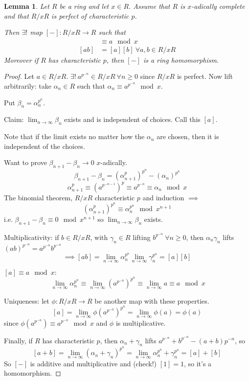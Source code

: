 \documentclass[a4paper]{article}
\newtheorem{lemma}[definition]{Lemma}
\begin{document}
\begin{lemma}
	Let $R$ be a ring and let $x \in R$.
	Assume that $R$ is $x$-adically complete and that $R/xR$ is perfect of characteristic $p$.
	
	Then $\exists!$ map $[-]: R/xR \to R$ such that
	\begin{align*}
		[a] &\equiv a \mod x \\
		[ab] &= [a][b]\ \forall a,b \in R/xR
	\end{align*}
	Moreover if $R$ has characteristic $p$, then $[-]$ is a ring homomorphism.
\end{lemma}
\begin{proof}
	Let $a \in R/xR$.
	$\exists!\ a^{p^{-n}} \in R/xR\ \forall n \geq 0$ since $R/xR$ is perfect.
	Now lift arbitrarily: take $\alpha_n \in R$ such that $\alpha_n \equiv a^{p^{-n}} \mod x$.
	
	Put $\beta_n = \alpha_n^{p^n}$.
	
	Claim: $\lim_{n \to \infty} \beta_n$ exists and is independent of choices. Call this $[a]$.
	
	Note that if the limit exists no matter how the $\alpha_n$ are chosen,
	then it is independent of the choices.
	
	Want to prove $\beta_{n+1} - \beta_n \to 0$ $x$-adically.
	$$\beta_{n+1} - \beta_n = (\alpha_{n+1}^p)^{p^n}-(\alpha_{n})^{p^n}$$
	$$\alpha_{n+1}^p \equiv (a^{p^{-n-1}})^p \equiv a^{p^{-n}} \equiv \alpha_n \mod x$$
	The binomial theorem, $R/xR$ characteristic $p$ and induction $\implies$
	$$(\alpha_{n+1}^p)^{p^n} \equiv \alpha_n^{p^n} \mod x^{n+1}$$
	i.e. $\beta_{n+1} - \beta_n \equiv 0 \mod x^{n+1}$ so $\lim_{n \to \infty} \beta_n$ exists.
	
	Multiplicativity: if $b \in R/xR$, 
	with $\gamma_n \in R$ lifting $b^{p^{-n}}\ \forall n \geq 0$,
	then $\alpha_n\gamma_n$ lifts $(ab)^{p^{-n}} = a^{p^{-n}}b^{p^{-n}}$
	$$\implies [ab] = \lim_{n\to\infty}\alpha_n^{p^n}\lim_{n\to\infty}\gamma_n^{p^n}=[a][b]$$
	
	$[a]\equiv a \mod x:$
	$$\ \lim_{n\to\infty}\alpha_n^{p^n}\equiv\lim_{n\to\infty}(a^{p^{-n}})^{p^n}\equiv \lim_{n\to\infty} a \equiv a \mod x$$
	
	Uniqueness: let $\phi: R/xR \to R$ be another map with these properties.
	$$[a] = \lim_{n \to \infty} \phi(a^{p^{-n}})^{p^n} = \lim_{n\to\infty}\phi(a) = \phi(a)$$
	since $\phi(a^{p^{-n}}) \equiv a^{p^{-n}} \mod x$ and $\phi$ is multiplicative.
	
	Finally, if $R$ has characteristic $p$,
	then $\alpha_n+\gamma_n$ lifts $a^{p^{-n}}+b^{p^{-n}}-(a+b)p^{-n}$, so
	$$[a+b] = \lim_{n\to\infty}(\alpha_n+\gamma_n)^{p^n} = \lim_{n\to\infty}\alpha_n^{p^n}+\gamma_n^{p^n} = [a] + [b]$$
	So $[-]$ is additive and multiplicative and (check!) $[1]=1$, so it's a homomorphism.
\end{proof}
\end{document}
